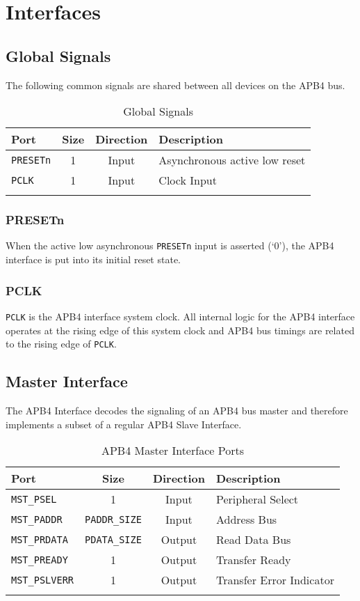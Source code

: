 \chapter{Interfaces} \label{interfaces}

\section{Global Signals} \label{global-signals}

The following common signals are shared between all devices on the APB4
bus.

\begin{longtable}[]{@{}lccl@{}}
	\toprule
	Port & Size & Direction & Description\tabularnewline
	\midrule
	\endhead
	\texttt{PRESETn} & 1 & Input & Asynchronous active low reset\tabularnewline
	\texttt{PCLK} & 1 & Input & Clock Input\tabularnewline
	\bottomrule
	\caption{Global Signals}
\end{longtable}


\subsection{PRESETn} \label{presetn}

When the active low asynchronous \texttt{PRESETn} input is asserted (`0'), the
APB4 interface is put into its initial reset state.

\subsection{PCLK} \label{pclk}

\texttt{PCLK} is the APB4 interface system clock. All internal logic for the APB4
interface operates at the rising edge of this system clock and APB4 bus
timings are related to the rising edge of \texttt{PCLK}.

\section{Master Interface} \label{master-interface-1}

The APB4 Interface decodes the signaling of an APB4 bus master and
therefore implements a subset of a regular APB4 Slave Interface.

\begin{longtable}[]{@{}lccl@{}}
	\toprule
  	Port         & Size        & Direction & Description\tabularnewline
	\midrule
	\endhead
	  \texttt{MST\_PSEL}    & 1           & Input  & Peripheral Select\tabularnewline
	  \texttt{MST\_PADDR}   & \texttt{PADDR\_SIZE} & Input  & Address Bus\tabularnewline
	  \texttt{MST\_PRDATA}  & \texttt{PDATA\_SIZE} & Output & Read Data Bus\tabularnewline
	  \texttt{MST\_PREADY}  & 1           & Output & Transfer Ready\tabularnewline
	  \texttt{MST\_PSLVERR} & 1           & Output & Transfer Error Indicator\tabularnewline
	\bottomrule
	\caption{APB4 Master Interface Ports}
\end{longtable}

